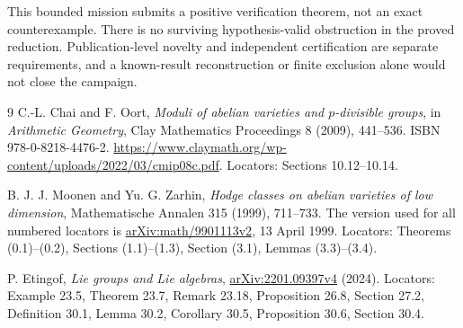 \documentclass[11pt]{article}
\theoremstyle{remark}
\begin{document}
This bounded mission submits a positive verification theorem, not
an exact counterexample. There is no surviving hypothesis-valid
obstruction in the proved reduction. Publication-level novelty and
independent certification are separate requirements, and a
known-result reconstruction or finite exclusion alone would not
close the campaign.

\begin{thebibliography}{9}
C.-L. Chai and F. Oort,
\emph{Moduli of abelian varieties and $p$-divisible groups},
in \emph{Arithmetic Geometry}, Clay Mathematics Proceedings 8 (2009),
441--536. ISBN 978-0-8218-4476-2.
\url{https://www.claymath.org/wp-content/uploads/2022/03/cmip08c.pdf}.
Locators: Sections 10.12--10.14.

B. J. J. Moonen and Yu. G. Zarhin,
\emph{Hodge classes on abelian varieties of low dimension},
Mathematische Annalen 315 (1999), 711--733.
The version used for all numbered locators is
\href{https://arxiv.org/abs/math/9901113v2}{arXiv:math/9901113v2},
13 April 1999. Locators: Theorems (0.1)--(0.2),
Sections (1.1)--(1.3), Section (3.1), Lemmas (3.3)--(3.4).

P. Etingof, \emph{Lie groups and Lie algebras},
\href{https://arxiv.org/abs/2201.09397v4}{arXiv:2201.09397v4} (2024).
Locators: Example 23.5, Theorem 23.7, Remark 23.18,
Proposition 26.8, Section 27.2, Definition 30.1, Lemma 30.2,
Corollary 30.5, Proposition 30.6, Section 30.4.
\end{thebibliography}
\end{document}

